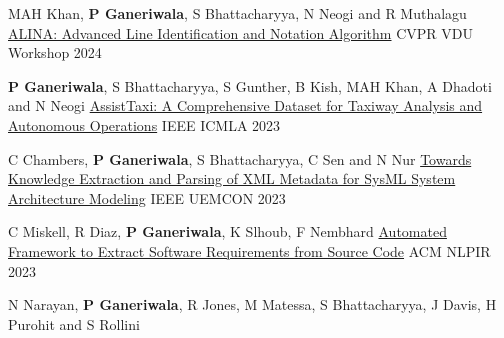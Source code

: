 \begin{cventries}
{\begin{cvitems}
\end{cvitems}
}
\cventry
{MAH Khan, \textbf{P Ganeriwala}, S Bhattacharyya, N Neogi and R Muthalagu }
{\href{https://openaccess.thecvf.com/content/CVPR2024W/VDU/html/Khan_ALINA_Advanced_Line_Identification_and_Notation_Algorithm_CVPRW_2024_paper.html}{ALINA: Advanced Line Identification and Notation Algorithm}}
{}
{CVPR VDU Workshop 2024} 
{ %
\begin{cvitems}
\end{cvitems}
}
\cventry
{\textbf{P Ganeriwala}, S Bhattacharyya, S Gunther, B Kish, MAH Khan, A Dhadoti and N Neogi}
{\href{https://ieeexplore.ieee.org/abstract/document/10459875}{AssistTaxi: A Comprehensive Dataset for Taxiway Analysis and Autonomous Operations}}
{}
{IEEE ICMLA 2023} 
{ %
\begin{cvitems}
\end{cvitems}
}
\cventry
{C Chambers, \textbf{P Ganeriwala}, S Bhattacharyya, C Sen and N Nur }
{\href{https://ieeexplore.ieee.org/abstract/document/10316143}{Towards Knowledge Extraction and Parsing of XML Metadata for SysML System Architecture Modeling}}
{}
{IEEE UEMCON 2023} 
{ %
\begin{cvitems}
\end{cvitems}
}
\cventry
{C Miskell, R Diaz, \textbf{P Ganeriwala}, K Slhoub, F Nembhard}
{\href{https://dl.acm.org/doi/abs/10.1145/3639233.3639242}{Automated Framework to Extract Software Requirements from Source Code}}
{}
{ACM NLPIR 2023} 
{ %
\begin{cvitems}
\end{cvitems}
}
\cventry
{N Narayan, \textbf{P Ganeriwala}, R Jones, M Matessa, S Bhattacharyya, J Davis, H Purohit and S Rollini}

\end{cventries}
